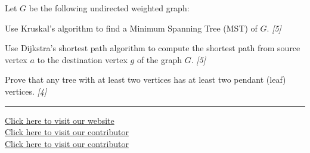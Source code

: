 \documentclass[11pt,a4paper]{article}
\newcommand{\pts}[1]{\hfill   \textit{[#1]}}
\begin{document}
\begin{parts}
  \item Let $G$ be the following undirected weighted graph:
  
\begin{center}
    
  \end{center}
  
\begin{parts}
    \item Use Kruskal's algorithm to find a Minimum Spanning Tree (MST) of $G$. \pts{5}
    \item Use Dijkstra's shortest path algorithm to compute the shortest path from source vertex $a$ to the destination vertex $g$ of the graph $G$. \pts{5}
  \end{parts}
  \item Prove that any tree with at least two vertices has at least two pendant (leaf) vertices. \pts{4}
\end{parts}

\vfill
\rule{\linewidth}{0.4pt}

\begin{center}\small
\href{https://bhu-exam.vercel.app/}{Click here to visit our website}\\[4pt]
\href{https://me-aryan.vercel.app/}{Click here to visit our contributor}\\[4pt]
\href{https://quashan-me.vercel.app/}{Click here to visit our contributor}
\end{center}
\end{document}
